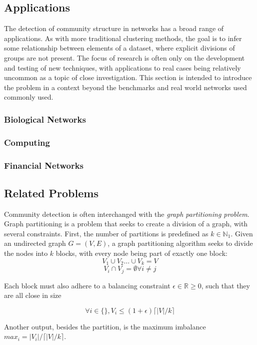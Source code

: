 \subsection{Applications}
The detection of community structure in networks has a broad range of applications. As with more traditional clustering methods, the goal is to infer some relationship between elements of a dataset, where explicit divisions of groups are not present. The focus of research is often only on the development and testing of new techniques, with applications to real cases being relatively uncommon as a topic of close investigation. This section is intended to introduce the problem in a context beyond the benchmarks and real world networks used commonly used.

\subsubsection{Biological Networks}

\subsubsection{Computing}

\subsubsection{Financial Networks}


\subsection{Related Problems}

Community detection is often interchanged with the \textit{graph partitioning problem}. Graph partitioning is a problem that seeks to create a division of a graph, with several constraints. First, the number of partitions is predefined as $k \in \mathbb{N}_1$. Given an undirected graph $G=(V,E)$, a graph partitioning algorithm seeks to divide the nodes into $k$ blocks, with every node being part of exactly one block:
$$V_1 \cup V_2 \dots \cup V_k = V$$
$$V_i \cap V_j = \emptyset \forall i\neq j$$

Each block must also adhere to a balancing constraint $\epsilon \in \mathbb{R}\geq0$, such that they are all close in size

$$\forall i \in \{\}, V_i \leq (1+\epsilon)\lceil|V|/k\rceil$$

Another output, besides the partition, is the maximum imbalance $max_i=|V_i|/\lceil|V|/k\rceil$.

